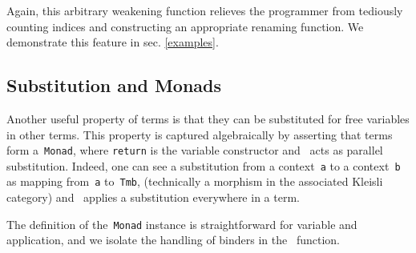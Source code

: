 \documentclass[9pt,preprint,authoryear]{sigplanconf}
\begin{document}
%
Again, this arbitrary weakening function relieves the programmer from
    tediously counting indices and constructing an appropriate renaming function. We
    demonstrate this feature in sec. \ref{examples}.%


\subsection{Substitution and Monads\label{monadSec}}

%
Another useful property of terms is that they can be substituted for free variables in
    other terms. This property is captured algebraically by asserting
    that terms form a{~}\textcolor[rgb]{0,0,0.80}{\texttt{Monad}}, where \textcolor[rgb]{0,0,0.80}{\texttt{return}} is the variable
    constructor and{~}\textcolor[rgb]{0,0,0.80}{\texttt{\makebox[1.22ex][c]{\textgreater{}}}} acts as parallel substitution. Indeed, one
    can see a substitution from a context{~}\textcolor[rgb]{0,0,0.80}{\texttt{a}} to a context{~}\textcolor[rgb]{0,0,0.80}{\texttt{b}} as
    mapping from{~}\textcolor[rgb]{0,0,0.80}{\texttt{a}} to{~}\textcolor[rgb]{0,0,0.80}{\texttt{Tm}}\textcolor[rgb]{0,0,0.80}{\texttt{\mbox{\hspace{0.50em}}}}\textcolor[rgb]{0,0,0.80}{\texttt{b}}, (technically a morphism in the associated Kleisli
    category) and{~}\textcolor[cmyk]{0,0.65,0.99,0}{\texttt{\makebox[1.22ex][l]{$ {(} $}}}\textcolor[rgb]{0,0,0.80}{\texttt{\makebox[1.22ex][c]{\textgreater{}}}}\textcolor[cmyk]{0,0.65,0.99,0}{\texttt{\makebox[1.22ex][r]{$ {)} $}}} applies a substitution everywhere in a term.%


%
The definition of the{~}\textcolor[rgb]{0,0,0.80}{\texttt{Monad}} instance is straightforward for
    variable and application, and we isolate the handling of binders in
    the{~}\textcolor[cmyk]{0,0.65,0.99,0}{\texttt{\makebox[1.22ex][l]{$ {(} $}}}\textcolor[rgb]{0,0,0.80}{\texttt{\makebox[1.22ex][c]{\textgreater{}}\makebox[1.22ex][c]{\textgreater{}}}}\textcolor[cmyk]{0,0.65,0.99,0}{\texttt{\makebox[1.22ex][r]{$ {)} $}}} function.%


{\nopagebreak }
\end{document}
